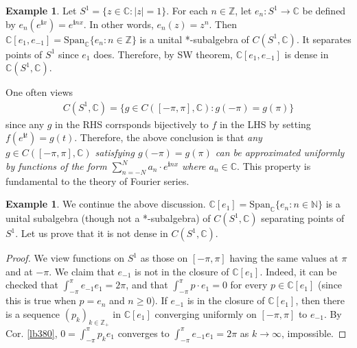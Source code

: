 \documentclass[12pt,b5paper,notitlepage]{article}
\theoremstyle{definition}
\newtheorem{eg}[df]{Example}
\theoremstyle{plain}
\newcommand{\Span}{\mathrm{Span}}
\newcommand{\im}{\mathbf{i}}
\newcommand{\Cbb}{\mathbb C}
\newcommand{\Nbb}{\mathbb N}
\newcommand{\Zbb}{\mathbb Z}
\numberwithin{equation}{section}
\begin{document}
\begin{eg}\label{lb443}
Let $S^1=\{z\in\Cbb:|z|=1\}$. For each $n\in\Zbb$, let $e_n:S^1\rightarrow \Cbb$ be defined by $e_n(e^{\im x})=e^{\im nx}$. In other words, $e_n(z)=z^n$. Then $\Cbb[e_1,e_{-1}]=\Span_\Cbb\{e_n:n\in\Zbb\}$ is a unital *-subalgebra of $C(S^1,\Cbb)$. It separates points of $S^1$ since $e_1$ does. Therefore, by SW theorem, $\Cbb[e_1,e_{-1}]$ is dense in $\Cbb(S^1,\Cbb)$. 

One often views
\begin{align}
C(S^1,\Cbb)=\{g\in C([-\pi,\pi],\Cbb):g(-\pi)=g(\pi)\}
\end{align}
since any $g$ in the RHS corrsponds bijectively to $f$ in the LHS by setting $f(e^{\im t})=g(t)$. Therefore, the above conclusion is that \textit{any $g\in C([-\pi,\pi],\Cbb)$ satisfying $g(-\pi)=g(\pi)$ can be approximated uniformly by functions of the form $\sum_{n=-N}^N a_n\cdot e^{\im nx}$ where $a_n\in\Cbb$}. This property is fundamental  to the theory of Fourier series. \hfill\qedsymbol
\end{eg}


\begin{eg}
We continue the above discussion. $\Cbb[e_1]=\Span_\Cbb\{e_n:n\in\Nbb\}$ is a unital subalgebra (though not a *-subalgebra) of $C(S^1,\Cbb)$ separating points of $S^1$. Let us prove that it is not dense in $C(S^1,\Cbb)$. 
\end{eg}

\begin{proof}
We view functions on $S^1$ as those on $[-\pi,\pi]$ having the same values at $\pi$ and at $-\pi$. We claim that $e_{-1}$ is not in the closure of $\Cbb[e_1]$. Indeed, it can be checked that $\int_{-\pi}^{\pi}e_{-1}e_1=2\pi$, and that $\int_{-\pi}^{\pi} p\cdot e_1=0$ for every $p\in\Cbb[e_1]$ (since this is true when $p=e_n$ and $n\geq0$). If $e_{-1}$ is in the closure of $\Cbb[e_1]$, then there is a sequence $(p_k)_{k\in\Zbb_+}$ in $\Cbb[e_1]$ converging uniformly on $[-\pi,\pi]$ to $e_{-1}$. By Cor. \ref{lb380}, $0=\int_{-\pi}^\pi p_ke_1$ converges  to $\int_{-\pi}^\pi e_{-1}e_1=2\pi$ as $k\rightarrow\infty$, impossible.  
\end{proof}
\end{document}
